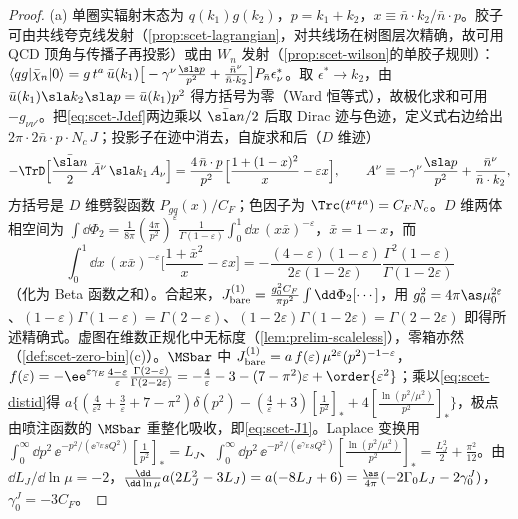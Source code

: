 \begin{proof}
(a) 单圈实辐射末态为 $q(k_1)g(k_2)$，$p=k_1+k_2$，$x\equiv\bar n\cdot k_2/\bar n\cdot p$。胶子可由共线夸克线发射（\cref{prop:scet-lagrangian}，对共线场在树图层次精确，故可用 QCD 顶角与传播子再投影）或由 $W_n$ 发射（\cref{prop:scet-wilson}的单胶子规则）：
$\langle qg|\bar\chi_n|0\rangle=g\,t^a\,\bar u(k_1)\big[-\gamma^\nu\frac{\sla p}{p^2}+\frac{\bar n^\nu}{\bar n\cdot k_2}\big]P_{\bar n}\epsilon^*_\nu$。取 $\epsilon^*\to k_2$，由 $\bar u(k_1)\sla k_2\sla p=\bar u(k_1)p^2$ 得方括号为零（Ward 恒等式），故极化求和可用 $-g_{\nu\nu'}$。把\cref{eq:scet-Jdef}两边乘以 $\bar{\sla n}/2$ 后取 Dirac 迹与色迹，定义式右边给出 $2\pi\cdot2\bar n\cdot p\cdot N_c\,J$；投影子在迹中消去，自旋求和后（$D$ 维迹）
\[
-\TrD\Big[\frac{\bar{\sla n}}{2}\,\bar A^\nu\,\sla k_1\,A_\nu\Big]=\frac{4\,\bar n\cdot p}{p^2}\Big[\frac{1+(1-x)^2}{x}-\varepsilon x\Big],\qquad A^\nu\equiv-\gamma^\nu\frac{\sla p}{p^2}+\frac{\bar n^\nu}{\bar n\cdot k_2},
\]
方括号是 $D$ 维劈裂函数 $P_{gq}(x)/C_F$；色因子为 $\Trc(t^at^a)=C_FN_c$。$D$ 维两体相空间为 $\int\dd\Phi_2=\frac{1}{8\pi}(\frac{4\pi}{p^2})^\varepsilon\frac{1}{\Gamma(1-\varepsilon)}\int_0^1\dd x\,(x\bar x)^{-\varepsilon}$，$\bar x=1-x$，而
\[
\int_0^1\dd x\,(x\bar x)^{-\varepsilon}\Big[\frac{1+\bar x^2}{x}-\varepsilon x\Big]=-\frac{(4-\varepsilon)(1-\varepsilon)}{2\varepsilon(1-2\varepsilon)}\frac{\Gamma^2(1-\varepsilon)}{\Gamma(1-2\varepsilon)}
\]
（化为 Beta 函数之和）。合起来，$J^{(1)}_{\rm bare}=\frac{g_0^2C_F}{\pi p^2}\int\dd\Phi_2[\cdots]$，用 $g_0^2=4\pi\as\mu_0^{2\varepsilon}$、$(1-\varepsilon)\Gamma(1-\varepsilon)=\Gamma(2-\varepsilon)$、$(1-2\varepsilon)\Gamma(1-2\varepsilon)=\Gamma(2-2\varepsilon)$ 即得所述精确式。虚图在维数正规化中无标度（\cref{lem:prelim-scaleless}），零箱亦然（\cref{def:scet-zero-bin}(c)）。$\MSbar$ 中 $J^{(1)}_{\rm bare}=a\,f(\varepsilon)\,\mu^{2\varepsilon}(p^2)^{-1-\varepsilon}$，$f(\varepsilon)=-\ee^{\varepsilon\gamma_E}\frac{4-\varepsilon}{\varepsilon}\frac{\Gamma(2-\varepsilon)}{\Gamma(2-2\varepsilon)}=-\frac4\varepsilon-3-(7-\pi^2)\varepsilon+\order{\varepsilon^2}$；乘以\cref{eq:scet-distid}得
$a\{(\frac4{\varepsilon^2}+\frac3\varepsilon+7-\pi^2)\delta(p^2)-(\frac4\varepsilon+3)[\frac1{p^2}]_*+4[\frac{\ln(p^2/\mu^2)}{p^2}]_*\}$，极点由喷注函数的 $\MSbar$ 重整化吸收，即\cref{eq:scet-J1}。Laplace 变换用 $\int_0^\infty\dd p^2\,\ee^{-p^2/(\ee^{\gamma_E}sQ^2)}[\frac1{p^2}]_*=L_J$、$\int_0^\infty\dd p^2\,\ee^{-p^2/(\ee^{\gamma_E}sQ^2)}[\frac{\ln(p^2/\mu^2)}{p^2}]_*=\frac{L_J^2}{2}+\frac{\pi^2}{12}$。由 $\dd L_J/\dd\ln\mu=-2$，$\frac{\dd}{\dd\ln\mu}a(2L_J^2-3L_J)=a(-8L_J+6)=\frac{\as}{4\pi}(-2\Gamma_0L_J-2\gamma^J_0)$，$\gamma^J_0=-3C_F$。%

\end{proof}
